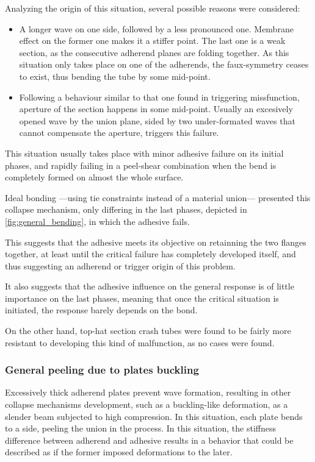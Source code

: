 \documentclass[cmfonts]{witpress}
\begin{document}
Analyzing the origin of this situation, several possible reasons were considered:
\begin{itemize}
	\item A longer wave on one side, followed by a less pronounced one. Membrane effect on the former one makes it a stiffer point. The last one is a weak section, as the consecutive adherend planes are folding together. As this situation only takes place on one of the adherends, the faux-symmetry ceases to exist, thus bending the tube by some mid-point.

	\item Following a behaviour similar to that one found in triggering missfunction, aperture of the section happens in some mid-point. Usually an excesively opened wave by the union plane, sided by two under-formated waves that cannot compensate the aperture, triggers this failure.
\end{itemize}

This situation usually takes place with minor adhesive failure on its initial phases, and rapidly failing in a peel-shear combination when the bend is completely formed on almost the whole surface.

Ideal bonding ---using tie constraints instead of a material union--- presented this collapse mechanism, only differing in the last phases, depicted in \cref{fig:general_bending}, in which the adhesive fails.

This suggests that the adhesive meets its objective on retainning the two flanges together, at least until the critical failure has completely developed itself, and thus suggesting an adherend or trigger origin of this problem.

It also suggests that the adhesive influence on the general response is of little importance on the last phases, meaning that once the critical situation is initiated, the response barely depends on the bond.

On the other hand, top-hat section crash tubes were found to be fairly more resistant to developing this kind of malfunction, as no cases were found.

\subsubsection{General peeling due to plates buckling}

Excessively thick adherend plates prevent wave formation, resulting in other collapse mechanisms development, such as a buckling-like deformation, as a slender beam subjected to high compression. In this situation, each plate bends to a side, peeling the union in the process. In this situation, the stiffness difference between adherend and adhesive results in a behavior that could be described as if the former imposed deformations to the later.
\end{document}

